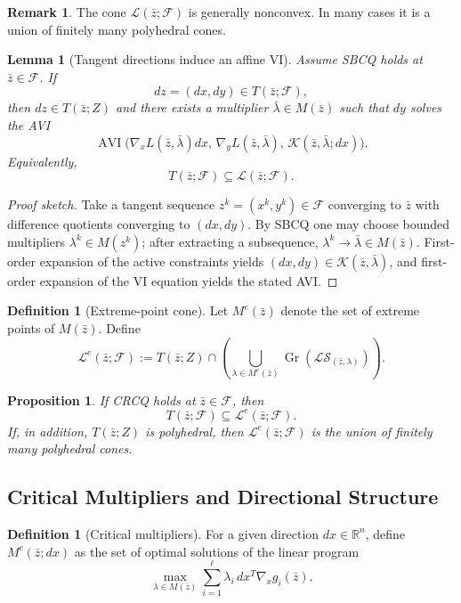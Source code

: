 \documentclass[pdflatex,sn-mathphys-num]{sn-jnl}%
\newtheorem{proposition}[theorem]{Proposition}
\newtheorem{lemma}[theorem]{Lemma}
\theoremstyle{definition}
\newtheorem{definition}[theorem]{Definition}
\newtheorem{remark}[theorem]{Remark}
\newcommand{\R}{\mathbb{R}}
\newcommand{\Fcal}{\mathcal{F}}
\newcommand{\Lcal}{\mathcal{L}}
\newcommand{\Kcal}{\mathcal{K}}
\newcommand{\Gr}{\operatorname{Gr}}
\newcommand{\AVI}{\operatorname{AVI}}
\begin{document}
\begin{remark}
The cone $\Lcal(\bar z;\Fcal)$ is generally nonconvex. In many cases it is a
union of finitely many polyhedral cones.
\end{remark}

\begin{lemma}[Tangent directions induce an affine VI]
\label{lem:321}
Assume SBCQ holds at $\bar z\in\Fcal$. If
\[
dz=(dx,dy)\in T(\bar z;\Fcal),
\]
then $dz\in T(\bar z;Z)$ and there exists a multiplier
$\bar\lambda\in M(\bar z)$ such that $dy$ solves the AVI
\[
\AVI\bigl(\nabla_xL(\bar z,\bar\lambda)dx,\,
          \nabla_yL(\bar z,\bar\lambda),\,
          \Kcal(\bar z,\bar\lambda;dx)\bigr).
\]
Equivalently,
\[
T(\bar z;\Fcal)\subseteq \Lcal(\bar z;\Fcal).
\]
\end{lemma}

\begin{proof}[Proof sketch]
Take a tangent sequence $z^k=(x^k,y^k)\in\Fcal$ converging to $\bar z$
with difference quotients converging to $(dx,dy)$. By SBCQ one may
choose bounded multipliers $\lambda^k\in M(z^k)$; after extracting a
subsequence, $\lambda^k\to\bar\lambda\in M(\bar z)$. First-order expansion
of the active constraints yields $(dx,dy)\in\Kcal(\bar z,\bar\lambda)$, and
first-order expansion of the VI equation yields the stated AVI.
\end{proof}

\begin{definition}[Extreme-point cone]
Let $M^e(\bar z)$ denote the set of extreme points of $M(\bar z)$. Define
\[
\Lcal^e(\bar z;\Fcal):=
T(\bar z;Z)\cap
\left(
\bigcup_{\lambda\in M^e(\bar z)}
\Gr(\mathscr{L}\mathscr{S}_{(\bar z,\lambda)})
\right).
\]
\end{definition}

\begin{proposition}
\label{prop:322}
If CRCQ holds at $\bar z\in\Fcal$, then
\[
T(\bar z;\Fcal)\subseteq \Lcal^e(\bar z;\Fcal).
\]
If, in addition, $T(\bar z;Z)$ is polyhedral, then
$\Lcal^e(\bar z;\Fcal)$ is the union of finitely many polyhedral cones.
\end{proposition}

\subsection{Critical Multipliers and Directional Structure}

\begin{definition}[Critical multipliers]
For a given direction $dx\in\R^n$, define $M^c(\bar z;dx)$ as the set of
optimal solutions of the linear program
\[
\max_{\lambda\in M(\bar z)}
\sum_{i=1}^{\ell}\lambda_i\,dx^T\nabla_x g_i(\bar z).
\]
\end{definition}
\end{document}
